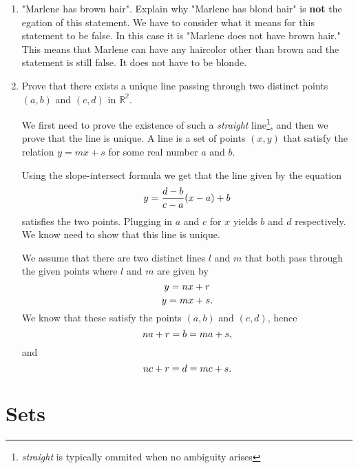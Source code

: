 \documentclass[a4paper, 11pt]{report}
\theoremstyle{plain}
\theoremstyle{definition}
\begin{document}
\begin{enumerate}
    \item "Marlene has brown hair". Explain why "Marlene has blond hair" is
      \textbf{not} the egation of this statement.
      We have to consider what it means for this statement to be false. In this
      case it is "Marlene does not have brown hair." This means that Marlene
      can have any haircolor other than brown and the statement is still false.
      It does not have to be blonde. 

    \item Prove that there exists a unique line passing through two distinct
      points $(a, b)$ and $(c, d)$ in $ \mathbb{R^2}$.
       
      We first need to prove the existence of such a \textit{straight}
      line\footnote{ \textit{straight} is typically ommited when no ambiguity
      arises}, and then we prove that the line is unique. A line is a set of
      points $(x, y)$ that satisfy the relation $y = mx + s$ for some real
      number $a$ and $b$.

      Using the slope-intersect formula we get that the line given by the
      equation
      \begin{equation}
        \notag
        y = \frac{d - b}{c - a}(x - a) + b
      \end{equation}
      satisfies the two points. Plugging in $a$ and $c$ for $x$ yields $b$ and
      $d$ respectively. We know need to show that this line is unique.
    
      We assume that there are two distinct lines $l$ and $m$ that both pass through the given points where $l$ and $m$ are given by
      \begin{equation}
        \notag
        y = nx + r
      \end{equation}
      \begin{equation}
        \notag
        y = mx + s.
      \end{equation}
      We know that these satisfy the points $(a, b)$ and $(c, d)$, hence
      \begin{equation}
        \notag
        na + r = b = ma + s, 
      \end{equation}
      and
      \begin{equation}
        \notag
        nc + r = d = mc + s.
      \end{equation}
            
\end{enumerate}
\chapter{Sets}
\label{cha:sets}
\printindex
\end{document}
